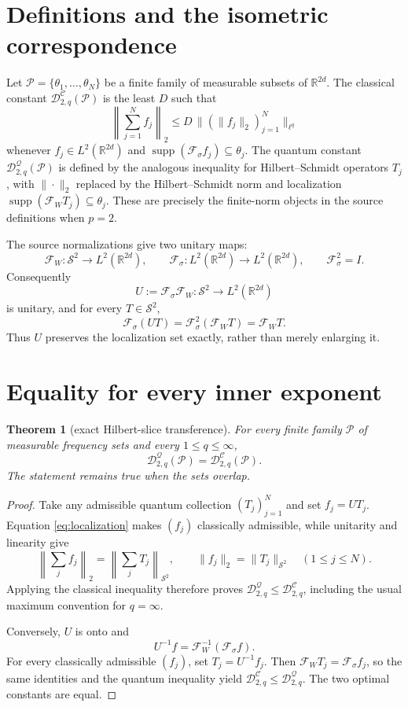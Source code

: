 \documentclass[11pt]{article}
\newtheorem{theorem}{Theorem}
\newcommand{\Fc}{\mathcal F_{\sigma}}
\newcommand{\Fw}{\mathcal F_W}
\newcommand{\Dc}{\mathcal D^{\mathscr C}}
\newcommand{\Dq}{\mathcal D^{\mathscr Q}}
\newcommand{\Sp}{\mathcal S}
\begin{document}
\section{Definitions and the isometric correspondence}

Let $\mathcal P=\{\theta_1,\ldots,\theta_N\}$ be a finite family of measurable
subsets of $\mathbb R^{2d}$.  The classical constant $\Dc_{2,q}(\mathcal P)$
is the least $D$ such that
\[
 \left\|\sum_{j=1}^N f_j\right\|_2
 \le D\,\bigl\|(\|f_j\|_2)_{j=1}^N\bigr\|_{\ell^q}
\]
whenever $f_j\in L^2(\mathbb R^{2d})$ and
$\operatorname{supp}(\Fc f_j)\subseteq\theta_j$.  The quantum constant
$\Dq_{2,q}(\mathcal P)$ is defined by the analogous inequality for
Hilbert--Schmidt operators $T_j$, with $\|\cdot\|_2$ replaced by the
Hilbert--Schmidt norm and localization
$\operatorname{supp}(\Fw T_j)\subseteq\theta_j$.  These are precisely the
finite-norm objects in the source definitions when $p=2$.

The source normalizations give two unitary maps:
\[
 \Fw:\Sp^2\longrightarrow L^2(\mathbb R^{2d}),
 \qquad
 \Fc:L^2(\mathbb R^{2d})\longrightarrow L^2(\mathbb R^{2d}),
 \qquad \Fc^2=I.
\]
Consequently
\[
 U:=\Fc\Fw:\Sp^2\longrightarrow L^2(\mathbb R^{2d})
\]
is unitary, and for every $T\in\Sp^2$,
\begin{equation}\label{eq:localization}
 \Fc(UT)=\Fc^2(\Fw T)=\Fw T.
\end{equation}
Thus $U$ preserves the localization set exactly, rather than merely
enlarging it.

\section{Equality for every inner exponent}

\begin{theorem}[exact Hilbert-slice transference]\label{thm:transfer}
For every finite family $\mathcal P$ of measurable frequency sets and every
$1\le q\le\infty$,
\[
 \boxed{\Dq_{2,q}(\mathcal P)=\Dc_{2,q}(\mathcal P).}
\]
The statement remains true when the sets overlap.
\end{theorem}

\begin{proof}
Take any admissible quantum collection $(T_j)_{j=1}^N$ and set $f_j=UT_j$.
Equation \eqref{eq:localization} makes $(f_j)$ classically admissible, while
unitarity and linearity give
\[
 \left\|\sum_j f_j\right\|_2
 =\left\|\sum_jT_j\right\|_{\Sp^2},
 \qquad
 \|f_j\|_2=\|T_j\|_{\Sp^2}\quad(1\le j\le N).
\]
Applying the classical inequality therefore proves
$\Dq_{2,q}\le\Dc_{2,q}$, including the usual maximum convention for
$q=\infty$.

Conversely, $U$ is onto and
\[
 U^{-1}f=\Fw^{-1}(\Fc f).
\]
For every classically admissible $(f_j)$, set $T_j=U^{-1}f_j$.  Then
$\Fw T_j=\Fc f_j$, so the same identities and the quantum inequality yield
$\Dc_{2,q}\le\Dq_{2,q}$.  The two optimal constants are equal.
\end{proof}
\end{document}
